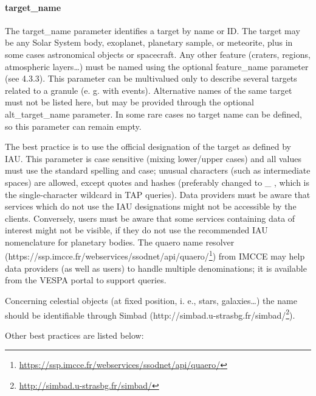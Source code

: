 \documentclass[11pt,a4paper]{ivoa}
\begin{document}
\paragraph{target\_name}

The target\_name parameter identifies a target by name or ID. The target may be any Solar System body, exoplanet, planetary sample, or meteorite, plus in some cases astronomical objects or spacecraft. Any other feature (craters, regions, atmospheric layers…) must be named using the optional feature\_name parameter (see 4.3.3). This parameter can be multivalued only to describe several targets related to a granule (e. g. with events). Alternative names of the same target must not be listed here, but may be provided through the optional alt\_target\_name parameter. In some rare cases no target name can be defined, so this parameter can remain empty.

The best practice is to use the official designation of the target as defined by IAU. This parameter is case sensitive (mixing lower/upper cases) and all values must use the standard spelling and case; unusual characters (such as intermediate spaces) are allowed, except quotes and hashes (preferably changed to \_ , which is the single-character wildcard in TAP queries). Data providers must be aware that services which do not use the IAU designations might not be accessible by the clients. Conversely, users must be aware that some services containing data of interest might not be visible, if they do not use the recommended IAU nomenclature for planetary bodies. The quaero name resolver (https://ssp.imcce.fr/webservices/ssodnet/api/quaero/\footnote{\url{https://ssp.imcce.fr/webservices/ssodnet/api/quaero/}}) from IMCCE may help data providers (as well as users) to handle multiple denominations; it is available from the VESPA portal to support queries.

Concerning celestial objects (at fixed position, i. e., stars, galaxies…) the name should be identifiable through Simbad (http://simbad.u-strasbg.fr/simbad/\footnote{\url{http://simbad.u-strasbg.fr/simbad/}}).

Other best practices are listed below:
\end{document}
